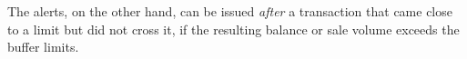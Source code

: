 The alerts, on the other hand, can be issued \emph{after} a transaction that came close to a limit but did not cross it, if the resulting balance or sale volume exceeds the buffer limits.




























